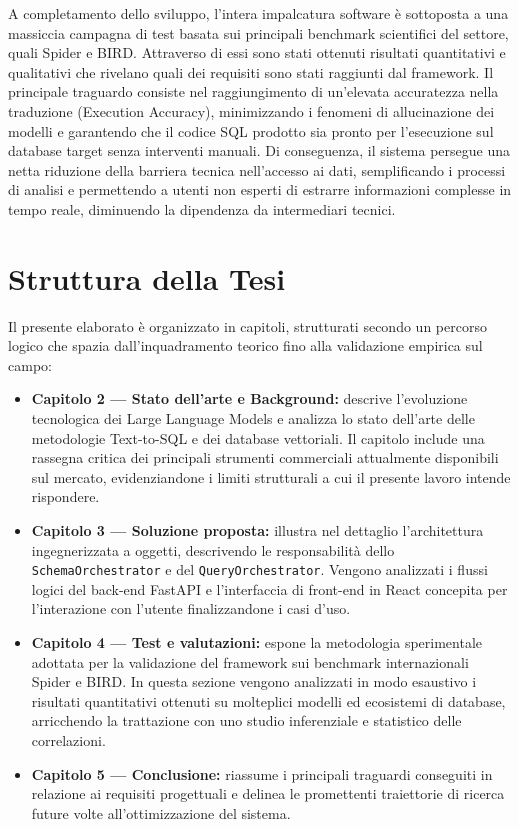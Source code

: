 A completamento dello sviluppo, l'intera impalcatura software è
sottoposta a una massiccia campagna di test basata sui principali
benchmark scientifici del settore, quali Spider e BIRD. Attraverso di essi
sono stati ottenuti risultati quantitativi e qualitativi che rivelano
quali dei requisiti sono stati raggiunti dal framework. 
Il principale traguardo consiste nel raggiungimento di
un'elevata accuratezza nella traduzione (Execution Accuracy),
minimizzando i fenomeni di allucinazione dei modelli e garantendo che il
codice SQL prodotto sia pronto per l'esecuzione sul database target
senza interventi manuali. Di conseguenza, il sistema persegue una netta
riduzione della barriera tecnica nell'accesso ai dati, semplificando i
processi di analisi e permettendo a utenti non esperti di estrarre
informazioni complesse in tempo reale, diminuendo la dipendenza da
intermediari tecnici.

\section{Struttura della Tesi}\label{struttura-della-tesi}

Il presente elaborato è organizzato in capitoli, strutturati secondo un
percorso logico che spazia dall'inquadramento teorico fino alla
validazione empirica sul campo:

\begin{itemize}
\item
  \textbf{Capitolo 2 --- Stato dell'arte e Background:} descrive
  l'evoluzione tecnologica dei Large Language Models e analizza lo stato
  dell'arte delle metodologie Text-to-SQL e dei database vettoriali. Il
  capitolo include una rassegna critica dei principali strumenti
  commerciali attualmente disponibili sul mercato, evidenziandone i
  limiti strutturali a cui il presente lavoro intende rispondere.
\item
  \textbf{Capitolo 3 --- Soluzione proposta:} illustra nel dettaglio
  l'architettura ingegnerizzata a oggetti, descrivendo le responsabilità
  dello \texttt{SchemaOrchestrator} e del \texttt{QueryOrchestrator}.
  Vengono analizzati i flussi logici del back-end FastAPI e
  l'interfaccia di front-end in React concepita per l'interazione con
  l'utente finalizzandone i casi d'uso.
\item
  \textbf{Capitolo 4 --- Test e valutazioni:} espone la metodologia
  sperimentale adottata per la validazione del framework sui benchmark
  internazionali Spider e BIRD. In questa sezione vengono analizzati in
  modo esaustivo i risultati quantitativi ottenuti su molteplici modelli
  ed ecosistemi di database, arricchendo la trattazione con uno studio
  inferenziale e statistico delle correlazioni.
\item
  \textbf{Capitolo 5 --- Conclusione:} riassume i principali traguardi
  conseguiti in relazione ai requisiti progettuali e delinea le
  promettenti traiettorie di ricerca future volte all'ottimizzazione del
  sistema.
\end{itemize}
